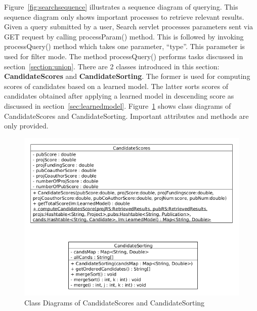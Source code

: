 Figure~\ref{fig:searchsequence} illustrates a sequence diagram of querying. This sequence diagram only shows important processes to retrieve
relevant results. Given a query submitted by a user, Search servlet processes parameters sent via GET request by calling processParam() method. This is
followed by invoking processQuery() method which takes one parameter, ``type''. This parameter is used for filter mode. The method processQuery() 
performs tasks discussed in section~\ref{section:union}. There are 2 classes introduced in this section: \textbf{CandidateScores} and 
\textbf{CandidateSorting}. The former is used for computing scores of candidates based on a learned model. The latter
sorts scores of candidates obtained after applying a learned model in descending score as discussed in section~\ref{sec:learnedmodel}.
Figure~\ref{fig:scoreandsorting} shows class diagrams of CandidateScores and CandidateSorting. Important attributes and methods are only provided.

\begin{figure}
\centering
\includegraphics[scale=0.5]{./figures/score&sorting.png}
\caption{Class Diagrams of CandidateScores and CandidateSorting} \label{fig:scoreandsorting} 
\end{figure}





